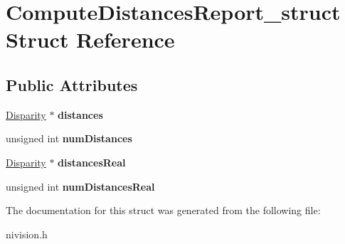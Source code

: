 \hypertarget{structComputeDistancesReport__struct}{
\section{ComputeDistancesReport\_\-struct Struct Reference}
\label{structComputeDistancesReport__struct}
}
\subsection*{Public Attributes}
\begin{DoxyCompactItemize}
\item 
\hypertarget{structComputeDistancesReport__struct_a4503cffaa2ad141706e1b939d157a4c8}{
\hyperlink{structDisparity__struct}{Disparity} $\ast$ {\bfseries distances}}
\label{structComputeDistancesReport__struct_a4503cffaa2ad141706e1b939d157a4c8}

\item 
\hypertarget{structComputeDistancesReport__struct_ad1891ecf701209262237478d089dc3d5}{
unsigned int {\bfseries numDistances}}
\label{structComputeDistancesReport__struct_ad1891ecf701209262237478d089dc3d5}

\item 
\hypertarget{structComputeDistancesReport__struct_abb09347f85d9ad8e6b87fb6d1451ad1b}{
\hyperlink{structDisparity__struct}{Disparity} $\ast$ {\bfseries distancesReal}}
\label{structComputeDistancesReport__struct_abb09347f85d9ad8e6b87fb6d1451ad1b}

\item 
\hypertarget{structComputeDistancesReport__struct_a081c8c2b6ba7485b99c3fc8a0c3088fe}{
unsigned int {\bfseries numDistancesReal}}
\label{structComputeDistancesReport__struct_a081c8c2b6ba7485b99c3fc8a0c3088fe}

\end{DoxyCompactItemize}


The documentation for this struct was generated from the following file:\begin{DoxyCompactItemize}
\item 
nivision.h\end{DoxyCompactItemize}
